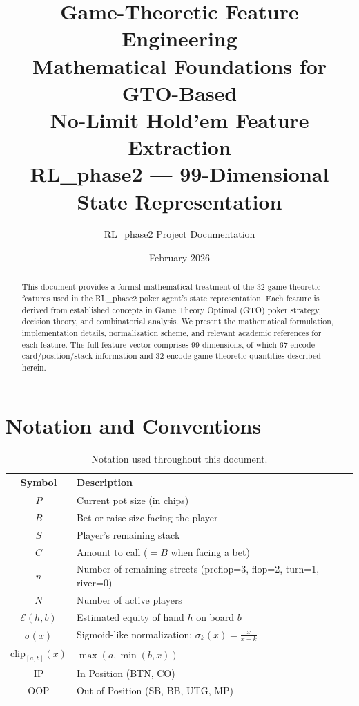\documentclass[11pt, a4paper]{article}
\title{
    \vspace{-1cm}
    \textbf{Game-Theoretic Feature Engineering}\\[0.3cm]
    \large Mathematical Foundations for GTO-Based\\
    No-Limit Hold'em Feature Extraction\\[0.3cm]
    \normalsize RL\_phase2 --- 99-Dimensional State Representation
}
\author{RL\_phase2 Project Documentation}
\date{February 2026}
\theoremstyle{definition}
\begin{document}
\maketitle

\begin{abstract}
This document provides a formal mathematical treatment of the 32 game-theoretic features
used in the RL\_phase2 poker agent's state representation. Each feature is derived from
established concepts in Game Theory Optimal (GTO) poker strategy, decision theory, and
combinatorial analysis. We present the mathematical formulation, implementation details,
normalization scheme, and relevant academic references for each feature. The full feature
vector comprises 99 dimensions, of which 67 encode card/position/stack information and
32 encode game-theoretic quantities described herein.
\end{abstract}

\tableofcontents
\newpage

\section{Notation and Conventions}

\begin{table}[H]
\centering
\begin{tabular}{cl}
\toprule
\textbf{Symbol} & \textbf{Description} \\
\midrule
$P$ & Current pot size (in chips) \\
$B$ & Bet or raise size facing the player \\
$S$ & Player's remaining stack \\
$C$ & Amount to call ($= B$ when facing a bet) \\
$n$ & Number of remaining streets (preflop=3, flop=2, turn=1, river=0) \\
$N$ & Number of active players \\
$\mathcal{E}(h, b)$ & Estimated equity of hand $h$ on board $b$ \\
$\sigma(x)$ & Sigmoid-like normalization: $\sigma_k(x) = \frac{x}{x + k}$ \\
$\text{clip}_{[a,b]}(x)$ & $\max(a, \min(b, x))$ \\
IP & In Position (BTN, CO) \\
OOP & Out of Position (SB, BB, UTG, MP) \\
\bottomrule
\end{tabular}
\caption{Notation used throughout this document.}
\end{table}
\end{document}

